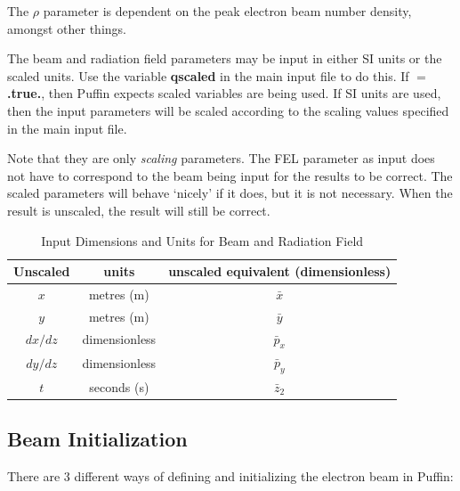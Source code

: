 \documentclass[12pt]{article}%
\begin{document}
The $\rho$ parameter is dependent on the peak electron beam number density, amongst other things.

The beam and radiation field parameters may be input in either SI units or the scaled units. Use the variable {\bf qscaled} in the main input file to do this. If $=$ {\bf .true.}, then Puffin expects scaled variables are being used. If SI units are used, then the input parameters will be scaled according to the scaling values specified in the main input file. 

Note that they are only \textit{scaling} parameters. The FEL parameter as input does not have to correspond to the beam being input for the results to be correct. The scaled parameters will behave `nicely' if it does, but it is not necessary. When the result is unscaled, the result will still be correct.



\begin{table}
\centering
\caption[Input Units]{Input Dimensions and Units for Beam and Radiation Field}
\begin{tabular}{|  c   | c  |   c   |}
\hline
Unscaled & units & unscaled equivalent (dimensionless) \\
\hline
$x$ & metres (m) & $\bar{x}$ \\
\hline
$y$ & metres (m) & $\bar{y}$ \\
\hline
$dx/dz$ & dimensionless & $\bar{p}_x$ \\
\hline
$dy/dz$ & dimensionless & $\bar{p}_y$ \\
\hline
$t$ & seconds (s) & $\bar{z}_2$ \\
\hline
\end{tabular}
\label{table}
\vspace*{-\baselineskip}
\end{table}













\subsection{Beam Initialization}
\label{beamfls}
There are 3 different ways of defining and initializing the electron beam in Puffin:
\end{document}
